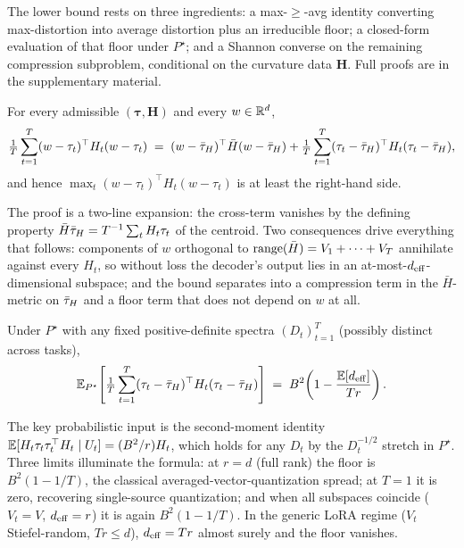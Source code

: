 The lower bound rests on three ingredients: a max-$\geq$-avg identity
converting max-distortion into average distortion plus an irreducible
floor; a closed-form evaluation of that floor under $P^\star$; and a
Shannon converse on the remaining compression subproblem, conditional
on the curvature data $\boldsymbol H$. Full proofs are in the
supplementary material.

\begin{lemma}\label{lem:id}
For every admissible $(\boldsymbol\tau, \boldsymbol H)$ and every
$w\in\mathbb{R}^d$,
\begin{equation}\label{eq:id-eq}
  \tfrac1T\sum_{t=1}^T (w-\tau_t)^\top H_t (w-\tau_t)
  \;=\; (w-\bar{\tau}_H)^\top\bar H(w-\bar{\tau}_H) + \tfrac1T\sum_{t=1}^T
  (\tau_t-\bar{\tau}_H)^\top H_t (\tau_t-\bar{\tau}_H),
\end{equation}
and hence $\max_t (w-\tau_t)^\top H_t(w-\tau_t)$ is at least the
right-hand side.
\end{lemma}

The proof is a two-line expansion: the cross-term vanishes by the
defining property $\bar H\bar{\tau}_H = T^{-1}\sum_t H_t\tau_t$ of the
centroid. Two consequences drive everything that follows: components
of $w$ orthogonal to $\operatorname{range}(\bar H) = V_1+\cdots+V_T$ annihilate
against every $H_t$, so without loss the decoder's output lies in an
at-most-$d_{\mathrm{eff}}$-dimensional subspace; and the bound separates into a
compression term in the $\bar H$-metric on $\bar{\tau}_H$ and a floor term
that does not depend on $w$ at all.

\begin{lemma}\label{lem:floor-general}
Under $P^\star$ with any fixed positive-definite spectra
$(D_t)_{t=1}^T$ (possibly distinct across tasks),
\begin{equation}\label{eq:floor-closed}
  \mathbb{E}_{P^\star}\!\left[\tfrac1T\sum_{t=1}^T(\tau_t-\bar{\tau}_H)^\top
   H_t(\tau_t-\bar{\tau}_H)\right]
  \;=\; B^2\!\left(1 - \frac{\mathbb{E}[d_{\mathrm{eff}}]}{Tr}\right).
\end{equation}
\end{lemma}

The key probabilistic input is the second-moment identity
$\mathbb{E}[H_t\tau_t\tau_t^\top H_t\mid U_t] = (B^2/r) H_t$, which holds for
any $D_t$ by the $D_t^{-1/2}$ stretch in $P^\star$. Three limits
illuminate the formula: at $r = d$ (full rank) the floor is
$B^2(1 - 1/T)$, the classical averaged-vector-quantization spread; at
$T = 1$ it is zero, recovering single-source quantization; and when
all subspaces coincide ($V_t = V$, $d_{\mathrm{eff}} = r$) it is again
$B^2(1 - 1/T)$. In the generic LoRA regime ($V_t$ Stiefel-random,
$Tr \leq d$), $d_{\mathrm{eff}} = Tr$ almost surely and the floor vanishes.

